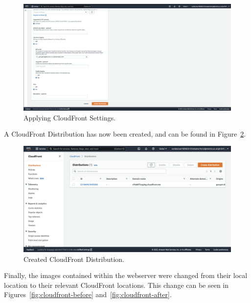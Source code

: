 \begin{figure}[!htbp]
    \centering
    \includegraphics[width=\textwidth]{resources/cloudfront/cloudfront-settings-2}
    \caption{Applying CloudFront Settings.}
    \label{fig:cloudfront-setting-2}
\end{figure}

\clearpage

A CloudFront Distribution has now been created, and can be found in Figure~\ref{fig:cloudfront-created}.

\begin{figure}[!htbp]
    \centering
    \includegraphics[width=\textwidth]{resources/cloudfront/cloudfront-created}
    \caption{Created CloudFront Distribution.}
    \label{fig:cloudfront-created}
\end{figure}

Finally, the images contained within the webserver were changed from their local location to their relevant CloudFront
locations.
This change can be seen in Figures~\ref{fig:cloudfront-before} and~\ref{fig:cloudfront-after}.


